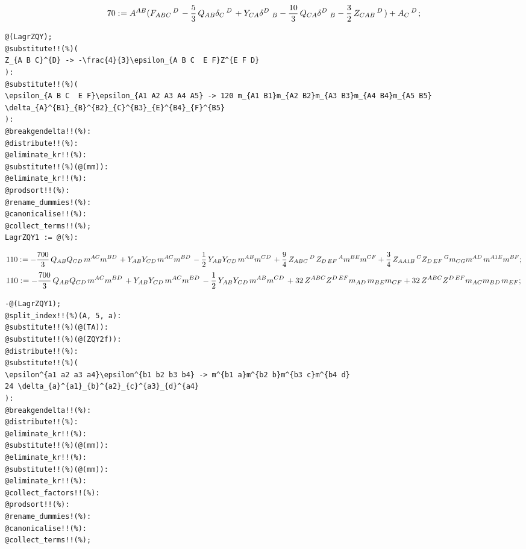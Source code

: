 \documentclass[11pt]{article}
\def\specialcolon{\mathrel{\mathop{:}}\hspace{-.5em}}
\begin{document}
\begin{dmath*}[compact, spread=2pt]
70\specialcolon{}= {A}^{A B} ({F}_{A B C}\,^{D\, } - \frac{5}{3}\, {Q}_{A B} {\delta}_{C}\,^{D\, } + {Y}_{C A} {\delta}^{D\, }\,_{B} - \frac{10}{3}\, {Q}_{C A} {\delta}^{D\, }\,_{B} - \frac{3}{2}\, {Z}_{C A B}\,^{D\, }) + {A}_{C}\,^{D\, };
\end{dmath*}
{\color[named]{Blue}\begin{verbatim}
@(LagrZQY);
@substitute!!(%)(
Z_{A B C}^{D} -> -\frac{4}{3}\epsilon_{A B C  E F}Z^{E F D}
):
@substitute!!(%)(
\epsilon_{A B C  E F}\epsilon_{A1 A2 A3 A4 A5} -> 120 m_{A1 B1}m_{A2 B2}m_{A3 B3}m_{A4 B4}m_{A5 B5}
\delta_{A}^{B1}_{B}^{B2}_{C}^{B3}_{E}^{B4}_{F}^{B5}
):
@breakgendelta!!(%):
@distribute!!(%):
@eliminate_kr!!(%):
@substitute!!(%)(@(mm)):
@eliminate_kr!!(%):
@prodsort!!(%):
@rename_dummies!(%):
@canonicalise!!(%):
@collect_terms!!(%);
LagrZQY1 := @(%):
\end{verbatim}}
\begin{dmath*}[compact, spread=2pt]
110\specialcolon{}=  - \frac{700}{3}\, {Q}_{A B} {Q}_{C D\, } {m}^{A C} {m}^{B D\, } + {Y}_{A B} {Y}_{C D\, } {m}^{A C} {m}^{B D\, } - \frac{1}{2}\, {Y}_{A B} {Y}_{C D\, } {m}^{A B} {m}^{C D\, } + \frac{9}{4}\, {Z}_{A B C}\,^{D\, } {Z}_{D\,  E F}\,^{A} {m}^{B E} {m}^{C F} + \frac{3}{4}\, {Z}_{A A1 B}\,^{C} {Z}_{D\,  E F}\,^{G} {m}_{C G} {m}^{A D\, } {m}^{A1 E} {m}^{B F};
\end{dmath*}
\begin{dmath*}[compact, spread=2pt]
110\specialcolon{}=  - \frac{700}{3}\, {Q}_{A B} {Q}_{C D\, } {m}^{A C} {m}^{B D\, } + {Y}_{A B} {Y}_{C D\, } {m}^{A C} {m}^{B D\, } - \frac{1}{2}\, {Y}_{A B} {Y}_{C D\, } {m}^{A B} {m}^{C D\, } + 32\, {Z}^{A B C} {Z}^{D\,  E F} {m}_{A D\, } {m}_{B E} {m}_{C F} + 32\, {Z}^{A B C} {Z}^{D\,  E F} {m}_{A C} {m}_{B D\, } {m}_{E F};
\end{dmath*}
{\color[named]{Blue}\begin{verbatim}
-@(LagrZQY1);
@split_index!!(%)(A, 5, a):
@substitute!!(%)(@(TA)):
@substitute!!(%)(@(ZQY2f)):
@distribute!!(%):
@substitute!!(%)(
\epsilon^{a1 a2 a3 a4}\epsilon^{b1 b2 b3 b4} -> m^{b1 a}m^{b2 b}m^{b3 c}m^{b4 d}
24 \delta_{a}^{a1}_{b}^{a2}_{c}^{a3}_{d}^{a4}
):
@breakgendelta!!(%):
@distribute!!(%):
@eliminate_kr!!(%):
@substitute!!(%)(@(mm)):
@eliminate_kr!!(%):
@substitute!!(%)(@(mm)):
@eliminate_kr!!(%):
@collect_factors!!(%):
@prodsort!!(%):
@rename_dummies!(%):
@canonicalise!!(%):
@collect_terms!!(%);
\end{verbatim}}
\end{document}
